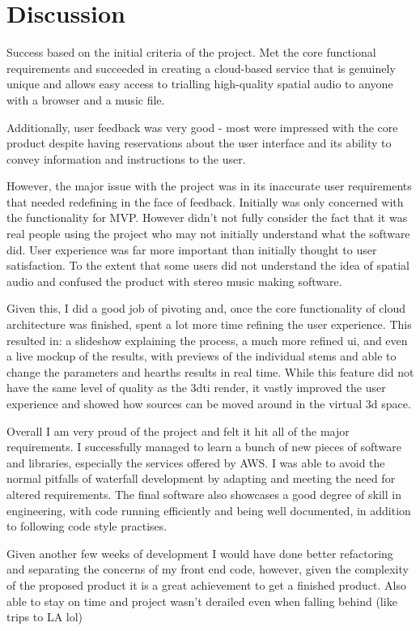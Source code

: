 \thispagestyle{plain}
\newpage
\section{Discussion}\label{sec:discussion}

\normalsize

Success based on the initial criteria of the project. Met the core functional requirements and succeeded in creating a cloud-based service that is genuinely unique and allows easy access to trialling high-quality spatial audio to anyone with a browser and a music file.

Additionally, user feedback was very good - most were impressed with the core product despite having reservations about the user interface and its ability to convey information and instructions to the user.

However, the major issue with the project was in its inaccurate user requirements that needed redefining in the face of feedback. Initially was only concerned with the functionality for MVP. However didn't not fully consider the fact that it was real people using the project who may not initially understand what the software did. User experience was far more important than initially thought to user satisfaction. To the extent that some users did not understand the idea of spatial audio and confused the product with stereo music making software.

Given this, I did a good job of pivoting and, once the core functionality of cloud architecture was finished, spent a lot more time refining the user experience. This resulted in: a slideshow explaining the process, a much more refined ui, and even a live mockup of the results, with previews of the individual stems and able to change the parameters and hearths results in real time. While this feature did not have the same level of quality as the 3dti render, it vastly improved the user experience and showed how sources can be moved around in the virtual 3d space.

Overall I am very proud of the project and felt it hit all of the major requirements. I successfully managed to learn a bunch of new pieces of software and libraries, especially the services offered by AWS. I was able to avoid the normal pitfalls of waterfall development by adapting and meeting the need for altered requirements. The final software also showcases a good degree of skill in engineering, with code running efficiently and being well documented, in addition to following code style practises.

Given another few weeks of development I would have done better refactoring and separating the concerns of my front end code, however, given the complexity of the proposed product it is a great achievement to get a finished product. Also able to stay on time and project wasn't derailed even when falling behind (like trips to LA lol)